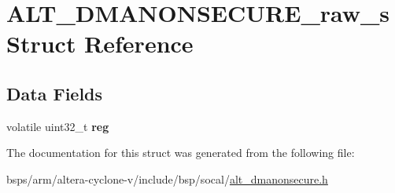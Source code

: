 \hypertarget{structALT__DMANONSECURE__raw__s}{}\section{A\+L\+T\+\_\+\+D\+M\+A\+N\+O\+N\+S\+E\+C\+U\+R\+E\+\_\+raw\+\_\+s Struct Reference}
\label{structALT__DMANONSECURE__raw__s}
\subsection*{Data Fields}
\begin{DoxyCompactItemize}
\item 
\mbox{\label{structALT__DMANONSECURE__raw__s_a117428c7f08d631bb71647a720dfb794}} 
volatile uint32\+\_\+t {\bfseries reg}
\end{DoxyCompactItemize}


The documentation for this struct was generated from the following file\+:\begin{DoxyCompactItemize}
\item 
bsps/arm/altera-\/cyclone-\/v/include/bsp/socal/\mbox{\hyperlink{alt__dmanonsecure_8h}{alt\+\_\+dmanonsecure.\+h}}\end{DoxyCompactItemize}
